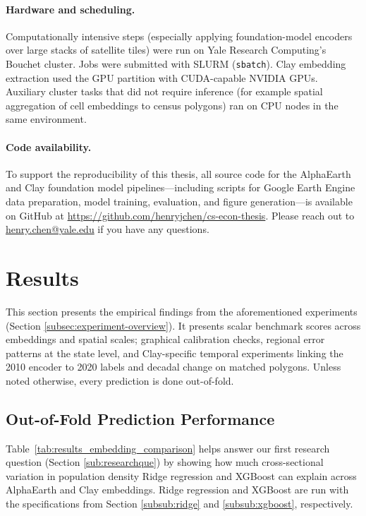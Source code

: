 \documentclass[12pt,letterpaper]{article}
\begin{document}
\paragraph{Hardware and scheduling.} Computationally intensive steps (especially applying foundation-model encoders over large stacks of satellite tiles) were run on Yale Research Computing's Bouchet cluster. Jobs were submitted with SLURM (\texttt{sbatch}). Clay embedding extraction used the GPU partition with CUDA-capable NVIDIA GPUs. Auxiliary cluster tasks that did not require inference (for example spatial aggregation of cell embeddings to census polygons) ran on CPU nodes in the same environment.

\paragraph{Code availability.} To support the reproducibility of this thesis, all source code for the AlphaEarth and Clay foundation model pipelines---including scripts for Google Earth Engine data preparation, model training, evaluation, and figure generation---is available on GitHub at \url{https://github.com/henryjchen/cs-econ-thesis}. Please reach out to \href{mailto:henry.chen@yale.edu}{henry.chen@yale.edu} if you have any questions.


\newpage

\section{Results}
\label{sec:results}

This section presents the empirical findings from the aforementioned experiments (Section \ref{subsec:experiment-overview}). It presents scalar benchmark scores across embeddings and spatial scales; graphical calibration checks, regional error patterns at the state level, and Clay-specific temporal experiments linking the 2010 encoder to 2020 labels and decadal change on matched polygons. Unless noted otherwise, every prediction is done out-of-fold.


\subsection{Out-of-Fold Prediction Performance}

Table~\ref{tab:results_embedding_comparison} helps answer our first research question (Section \ref{sub:researchque}) by showing how much cross-sectional variation in population density Ridge regression and XGBoost can explain across AlphaEarth and Clay embeddings. Ridge regression and XGBoost are run with the specifications from Section \ref{subsub:ridge} and \ref{subsub:xgboost}, respectively.
\end{document}
